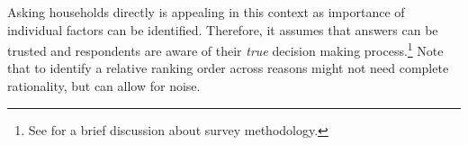 \documentclass[ProjectABM]{subfiles}
\begin{document}
Asking households directly is appealing in this context as importance of individual factors can be identified. Therefore, it assumes that answers can be trusted and respondents are aware of their \textit{true} decision making process.\footnote{See \cite{choi_2020} for a brief discussion about survey methodology.} Note that to identify a relative ranking order across reasons might not need complete rationality, but can allow for noise. %




\end{document}
